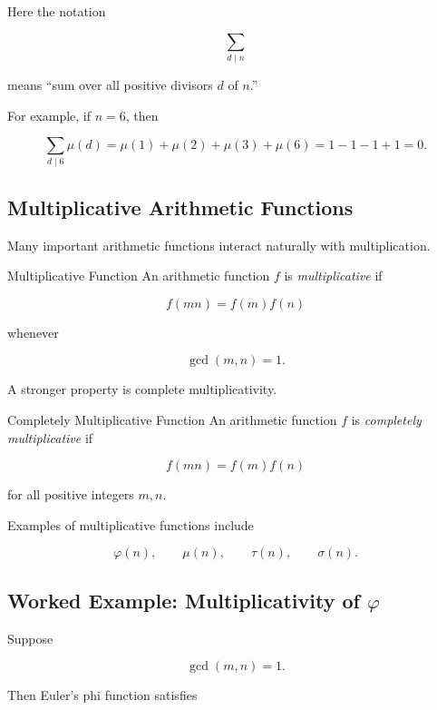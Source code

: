 Here the notation

\[ \sum_{d\mid n} \]

means ``sum over all positive divisors \(d\) of \(n\).''

For example, if \(n=6\), then

\[
\sum_{d\mid6}\mu(d)
=
\mu(1)+\mu(2)+\mu(3)+\mu(6)
=
1-1-1+1
=
0.
\]

\subsection{Multiplicative Arithmetic Functions}
\label{subsec:multiplicative-functions}

Many important arithmetic functions interact naturally with multiplication.

\begin{definitionbox}{Multiplicative Function}
An arithmetic function \(f\) is \emph{multiplicative} if

\[ f(mn)=f(m)f(n) \]

whenever

\[ \gcd(m,n)=1. \]
\end{definitionbox}

A stronger property is complete multiplicativity.

\begin{definitionbox}{Completely Multiplicative Function}
An arithmetic function \(f\) is \emph{completely multiplicative} if

\[ f(mn)=f(m)f(n) \]

for all positive integers \(m,n\).
\end{definitionbox}

Examples of multiplicative functions include

\[ \varphi(n),\qquad\mu(n),\qquad\tau(n),\qquad\sigma(n). \]

\subsection{Worked Example: Multiplicativity of \(\varphi\)}
\label{subsec:worked-phi-multiplicativity}

Suppose

\[ \gcd(m,n)=1. \]

Then Euler's phi function satisfies

